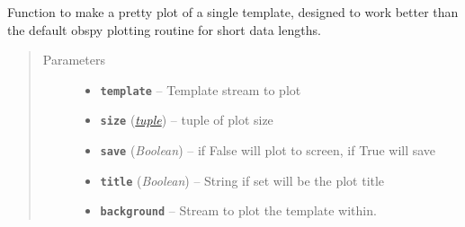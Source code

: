 \documentclass[a4paper,10pt,english]{sphinxmanual}
\begin{document}
\begin{fulllineitems}
\label{submodules/utils.EQcorrscan_plotting:EQcorrscan_plotting.pretty_template_plot}
Function to make a pretty plot of a single template, designed to work better
than the default obspy plotting routine for short data lengths.
\begin{quote}\begin{description}
\item[{Parameters}] \leavevmode\begin{itemize}
\item {} 
\textbf{\texttt{template}} -- Template stream to plot

\item {} 
\textbf{\texttt{size}} (\href{https://docs.python.org/library/functions.html\#tuple}{\emph{tuple}}) -- tuple of plot size

\item {} 
\textbf{\texttt{save}} (\emph{Boolean}) -- if False will plot to screen, if True will save

\item {} 
\textbf{\texttt{title}} (\emph{Boolean}) -- String if set will be the plot title

\item {} 
\textbf{\texttt{background}} -- Stream to plot the template within.

\end{itemize}

\end{description}\end{quote}

\end{fulllineitems}

\end{document}
